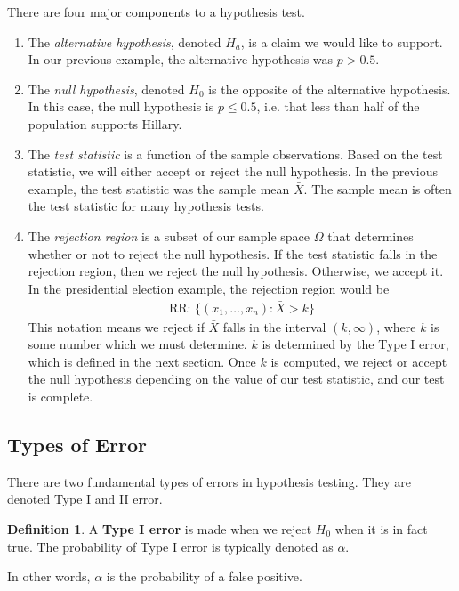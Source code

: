 \documentclass{tufte-book}
\theoremstyle{definition}
\numberwithin{theorem}{section}
\newtheorem{definition}[theorem]{Definition}
\numberwithin{definition}{section}
\numberwithin{lemma}{section}
\numberwithin{corollary}{section}
\numberwithin{proposition}{section}
\numberwithin{remark}{section}
\numberwithin{claim}{section}
\numberwithin{observation}{section}
\numberwithin{fact}{section}
\numberwithin{assumption}{section}
\numberwithin{example}{section}
\numberwithin{exercise}{section}
\begin{document}
There are four major components to a hypothesis test. 
\begin{enumerate}
\item The \textit{alternative hypothesis}, denoted $H_a$, is a claim we would like to support. In our previous example, the alternative hypothesis was $p > 0.5$. 

\item The \textit{null hypothesis}, denoted $H_0$ is the opposite of the alternative hypothesis. In this case, the null hypothesis is $p \leq 0.5$, i.e. that less than half of the population supports Hillary.

\item The \textit{test statistic} is a function of the sample observations. Based on the test statistic, we will either accept or reject the null hypothesis. In the previous example, the test statistic was the sample mean $\bar{X}$. The sample mean is often the test statistic for many hypothesis tests.

\item The \textit{rejection region} is a subset of our sample space $\Omega$ that determines whether or not to reject the null hypothesis. If the test statistic falls in the rejection region, then we reject the null hypothesis. Otherwise, we accept it. In the presidential election example, the rejection region would be 
\begin{align*}
\text{RR: } \{(x_1,\dots,x_n) : \bar{X} > k\}
\end{align*}
This notation means we reject if $\bar{X}$ falls in the interval $(k,\infty)$, where $k$ is some number which we must determine. $k$ is determined by the Type I error, which is defined in the next section. Once $k$ is computed, we reject or accept the null hypothesis depending on the value of our test statistic, and our test is complete.
\end{enumerate}

\subsection{Types of Error}
There are two fundamental types of errors in hypothesis testing. They are denoted Type I and II error.

\begin{definition}
A \textbf{Type I error} is made when we reject $H_0$ when it is in fact true. The probability of Type I error is typically denoted as $\alpha$.
\end{definition}
In other words, $\alpha$ is the probability of a false positive.
\end{document}
